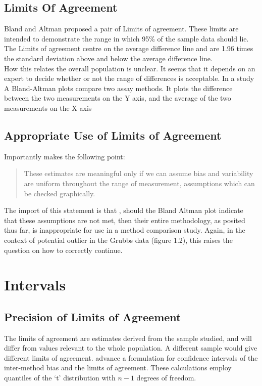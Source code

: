 \documentclass{report}
\begin{document}
	
	\subsection{Limits Of Agreement}
	Bland and Altman proposed a pair of Limits of agreement. These
	limits are intended to demonstrate the range in which 95\% of the
	sample data should lie. The Limits of agreement centre on the
	average difference line and are 1.96 times the standard deviation
	above and below the average difference line.
	\\
	How this relates the overall population is unclear. It seems that
	it depends on an expert to decide whether or not the range of
	differences is acceptable. In a study A Bland-Altman plots compare
	two assay methods. It plots the difference between the two
	measurements on the Y axis, and the average of the two
	measurements on the X axis
	\subsection{Appropriate Use of Limits of Agreement}
	Importantly \citet{BA99} makes the following point:
	\begin{quote}These estimates are meaningful only if we can assume
		bias and variability are uniform throughout the range of
		measurement, assumptions which can be checked graphically.
	\end{quote}
	
	The import of this statement is that , should the Bland Altman
	plot indicate that these assumptions are not met, then their
	entire methodology, as posited thus far, is inappropriate for use
	in a method comparison study. Again, in the context of potential
	outlier in the Grubbs data (figure 1.2), this raises the question
	on how to correctly continue.
	\section{Intervals}
	\subsection{Precision of Limits of Agreement}
	The limits of agreement are estimates derived from the sample
	studied, and will differ from values relevant to the whole
	population. A different sample would give different limits of
	agreement. \citet*{BA86} advance a formulation for confidence
	intervals of the inter-method bias and the limits of agreement.
	These calculations employ quantiles of the `t' distribution with
	$n -1$ degrees of freedom.
	
\end{document}
